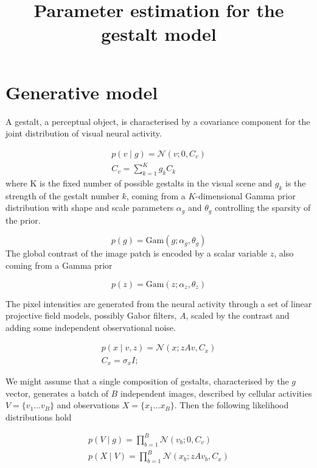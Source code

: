 \documentclass{paper}
\begin{document}
\title{Parameter estimation for the gestalt model}
\maketitle

\section{Generative model}

A gestalt, a perceptual object, is characterised by a covariance component for the joint distribution of visual neural activity. 

\begin{eqnarray}
p(v \mid g) = \mathcal{N}(v; 0,C_v) \\
C_v = \sum_{k=1}^K g_k C_k \label{eq:cv}
\end{eqnarray}
%
where K is the fixed number of possible gestalts in the visual scene and $g_k$ is the strength of the gestalt number $k$, coming from a $K$-dimensional Gamma prior distribution with shape and scale  parameters $\alpha_g$ and $\theta_g$ controlling the sparsity of the prior.

\begin{equation}
p(g) = \textrm{Gam}(g; \alpha_g,\theta_g)
\end{equation}
%
The global contrast of the image patch is encoded by a scalar variable $z$, also coming from a Gamma prior

\begin{equation}
p(z) = \textrm{Gam}(z; \alpha_z,\theta_z)
\end{equation}

The pixel intensities are generated from the neural activity through a set of linear projective field models, possibly Gabor filters, $A$, scaled by the contrast and adding some independent observational noise.

\begin{eqnarray}
p(x \mid v,z) = \mathcal{N}(x; zAv,C_x) \\
C_x = \sigma_x I;
\end{eqnarray}

We might assume that a single composition of gestalts, characterised by the $g$ vector, generates a batch of $B$ independent images, described by cellular activities $V = \lbrace v_1 \dots v_B \rbrace$ and observations $X = \lbrace x_1 \dots x_B \rbrace$. Then the following likelihood distributions hold

\begin{eqnarray}
p(V \mid g) = \prod_{b=1}^B \mathcal{N}(v_b; 0,C_v) \\
p(X \mid V) = \prod_{b=1}^B \mathcal{N}(x_b; zAv_b,C_x)
\end{eqnarray}
\end{document}
